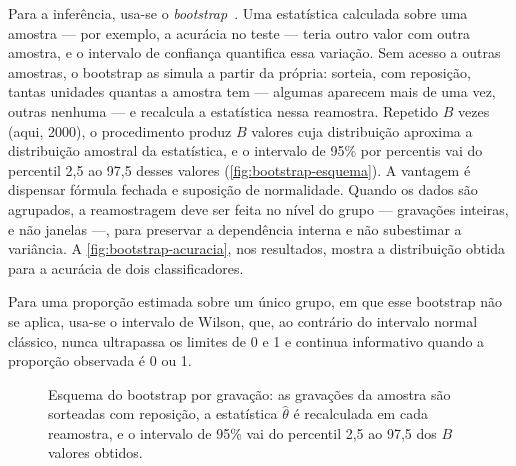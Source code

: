 Para a inferência, usa-se o \emph{bootstrap}~\cite[cap.~8]{wasserman2004}. Uma estatística
calculada sobre uma amostra --- por exemplo, a acurácia no teste --- teria outro
valor com outra amostra, e o intervalo de confiança quantifica essa variação. Sem
acesso a outras amostras, o bootstrap as simula a partir da própria: sorteia,
com reposição, tantas unidades quantas a amostra tem --- algumas aparecem mais de
uma vez, outras nenhuma --- e recalcula a estatística nessa reamostra. Repetido
$B$ vezes (aqui, \num{2000}), o procedimento produz $B$ valores cuja distribuição
aproxima a distribuição amostral da estatística, e o intervalo de 95\% por
percentis vai do percentil 2,5 ao 97,5 desses valores
(\autoref{fig:bootstrap-esquema}). A vantagem é dispensar fórmula fechada e
suposição de normalidade. Quando os dados são agrupados, a reamostragem deve ser
feita no nível do grupo --- gravações inteiras, e não janelas ---, para preservar
a dependência interna e não subestimar a variância. A
\autoref{fig:bootstrap-acuracia}, nos resultados, mostra a distribuição obtida
para a acurácia de dois classificadores.

Para uma proporção estimada sobre um único grupo, em
que esse bootstrap não se aplica, usa-se o intervalo de Wilson,
que, ao contrário do intervalo normal clássico, nunca ultrapassa os limites de 0
e 1 e continua informativo quando a proporção observada é 0 ou 1.

\begin{figure}[htb]
  \centering
  \caption{Esquema do bootstrap por gravação: as gravações da amostra são
  sorteadas com reposição, a estatística $\hat\theta$ é recalculada em cada
  reamostra, e o intervalo de 95\% vai do percentil 2,5 ao 97,5 dos $B$ valores
  obtidos.}
  \label{fig:bootstrap-esquema}
\end{figure}
